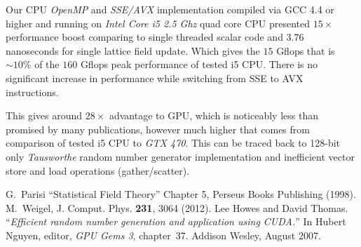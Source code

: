 \documentclass[a4paper]{llncs}
\begin{document}
Our CPU \emph{OpenMP} and \emph{SSE/AVX} implementation compiled via
GCC 4.4 or higher and running on \emph{Intel Core i5 2.5 Ghz} quad
core CPU presented $15\times$ performance boost comparing to single
threaded scalar code and $3.76$ nanoseconds for single lattice field
update.  Which gives the $15$ Gflops that is $\sim10\%$ of the  $160$
Gflops peak performance of tested i5 CPU. There is no significant
increase in performance while switching from SSE to AVX instructions.

This gives around $28\times$ advantage to GPU, which is noticeably
less than promised by many publications, however much higher that
comes from comparison of  tested i5
CPU to \emph{GTX 470}. This can be
traced back to 128-bit only \emph{Tausworthe} random number generator
implementation and inefficient vector store and load operations
(gather/scatter).

\begin{thebibliography}{9}
 G.~Parisi ``Statistical Field Theory'' Chapter 5, Perseus Books Publishing (1998).
 M.~Weigel, J. Comput. Phys. \textbf{231}, 3064 (2012).
Lee Howes and David Thomas.
``{\em Efficient random number generation and application using {CUDA}.}''
In Hubert Nguyen, editor, {\em GPU Gems 3}, chapter~37. Addison
  Wesley, August 2007.
\end{thebibliography}
\end{document}
